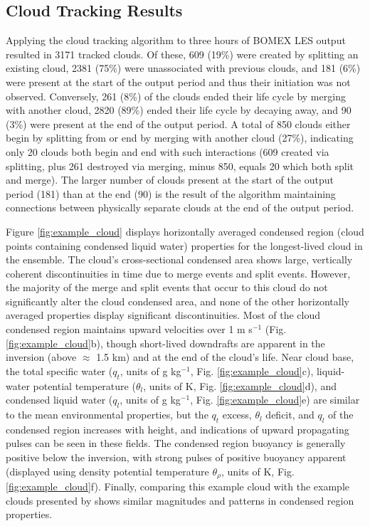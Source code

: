 \documentclass[acp]{copernicus}
\begin{document}
\subsection{Cloud Tracking Results}

Applying the cloud tracking algorithm to three hours of BOMEX LES output 
resulted in 3171 tracked clouds.  Of these, 609 (19\%) were created by 
splitting an existing cloud, 2381 (75\%) were unassociated with previous 
clouds, and 181 (6\%) were present at the start of the output period and thus 
their initiation was not observed.  Conversely, 261 (8\%) of the clouds ended 
their life cycle by merging with another cloud, 2820 (89\%) ended their 
life cycle by decaying away, and 90 (3\%) were present at the end of the output 
period.  A total of 850 clouds either begin by splitting from or end by merging 
with another cloud (27\%), indicating only 20 clouds both begin and end with 
such interactions (609 created via splitting, plus 261 destroyed via merging, 
minus 850, equals 20 which both split and merge).  The larger number of clouds 
present at the start of the output period (181) than at the end (90) is the 
result of the algorithm maintaining connections between physically separate 
clouds at the end of the output period.

Figure \ref{fig:example_cloud} displays horizontally averaged condensed region 
(cloud points containing condensed liquid water) properties for the 
longest-lived cloud in the ensemble.  The cloud's cross-sectional condensed 
area shows large, vertically coherent discontinuities in time due to merge 
events and split events.  However, the majority of the merge and split events 
that occur to this cloud do not significantly alter the cloud condensed area, 
and none of the other horizontally averaged properties display significant 
discontinuities.  Most of the cloud condensed region maintains upward 
velocities over 1 m s$^{-1}$ (Fig. \ref{fig:example_cloud}b), though 
short-lived downdrafts are apparent in the inversion (above $\approx$ 1.5 km) 
and at the end of the cloud's life.  Near cloud base, the total specific water 
($q_t$, units of g kg$^{-1}$, Fig. \ref{fig:example_cloud}c), liquid-water 
potential temperature ($\theta_l$, units of K, Fig. 
\ref{fig:example_cloud}d), and condensed liquid water ($q_l$, units of 
g kg$^{-1}$, Fig. \ref{fig:example_cloud}e) are similar to the mean 
environmental properties, but the $q_t$ excess, $\theta_l$ deficit, and 
$q_l$ of the condensed region increases with height, and indications of upward 
propagating pulses can be seen in these fields.  The condensed region buoyancy 
is generally positive below the inversion, with strong pulses of positive 
buoyancy apparent (displayed using density potential temperature 
$\theta_\rho$, units of K, Fig. \ref{fig:example_cloud}f).  Finally, 
comparing this example cloud with the example clouds presented by 
\citet[][figs. 4 and 5]{Heus2009} shows similar magnitudes and patterns in 
condensed region properties.
\end{document}
